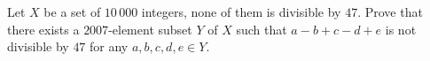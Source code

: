 Let $X$ be a set of $10\,000$ integers, none of them is divisible by $47$. Prove that there exists a $2007$-element subset $Y$ of $X$ such that $a - b + c - d + e$ is not divisible by $47$ for any $a, b, c, d, e \in Y$.
